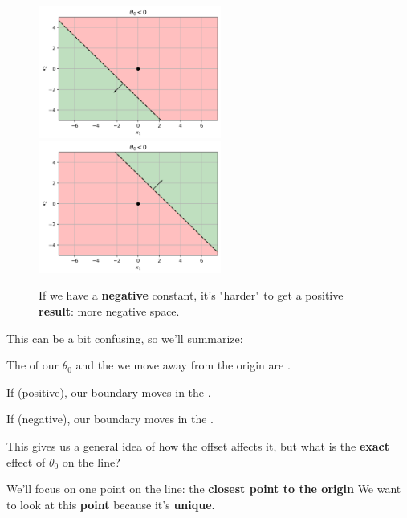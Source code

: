 \begin{itemize}
                \begin{figure}[H]
                    \centering                         \includegraphics[width=60mm,scale=0.5]{images/classification_images/theta_0_less_zero.png}
                    \includegraphics[width=60mm,scale=0.5]{images/classification_images/negative_theta0_positive_theta.png}
                        \caption*{If we have a \textbf{negative} constant, it's "harder" to get a positive \textbf{result}: more negative space.}
                \end{figure}
        \end{itemize}
        
        This can be a bit confusing, so we'll summarize:\\
        
            \begin{concept}
                The  of our $\theta_0$ and the  we move away from the origin are .
                
                If  (positive), our boundary moves in the .
                
                If  (negative), our boundary moves in the .
            \end{concept}
        
        This gives us a general idea of how the offset affects it, but what is the \textbf{exact} effect of $\theta_0$ on the line?
        
        We'll focus on one point on the line: the \textbf{closest point to the origin} We want to look at this \textbf{point} because it's \textbf{unique}.
    
